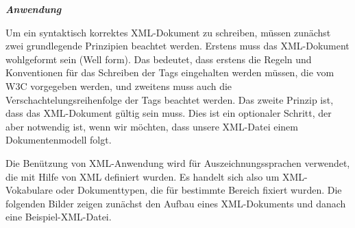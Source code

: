 \textit{\textbf{Anwendung}}

Um ein syntaktisch korrektes XML-Dokument zu schreiben, müssen zunächst zwei grundlegende Prinzipien beachtet werden. Erstens muss das XML-Dokument wohlgeformt sein (Well form). Das bedeutet, dass erstens die Regeln und Konventionen für das Schreiben der Tags eingehalten werden müssen, die vom W3C vorgegeben werden, und zweitens muss auch die Verschachtelungsreihenfolge der Tags beachtet werden. Das zweite Prinzip ist, dass das XML-Dokument gültig sein muss. Dies ist ein optionaler Schritt, der aber notwendig ist, wenn wir möchten, dass unsere XML-Datei einem Dokumentenmodell folgt.

Die Benützung von XML-Anwendung wird für Auszeichnungssprachen verwendet, die mit Hilfe von XML definiert wurden. Es handelt sich also um XML-Vokabulare oder Dokumenttypen, die für bestimmte Bereich fixiert wurden.\cite{helmut36}
Die folgenden Bilder zeigen zunächst den Aufbau eines XML-Dokuments und danach eine Beispiel-XML-Datei.

